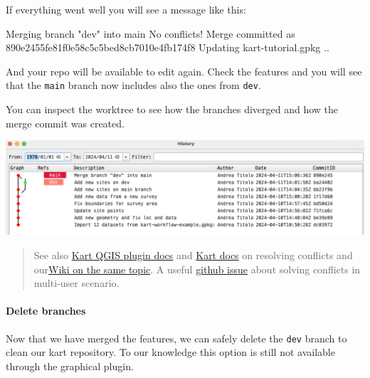\documentclass[
  letterpaper,
  DIV=11,
  numbers=noendperiod]{scrartcl}
\let\oldparagraph\paragraph
\renewcommand{\paragraph}[1]{\oldparagraph{#1}\mbox{}}
\newenvironment{Shaded}{\begin{snugshade}}{\end{snugshade}}
\newcommand{\ExtensionTok}[1]{\textcolor[rgb]{0.55,0.91,0.99}{#1}}
\newcommand{\NormalTok}[1]{\textcolor[rgb]{0.97,0.97,0.95}{#1}}
\newcommand{\StringTok}[1]{\textcolor[rgb]{0.95,0.98,0.55}{#1}}
\begin{document}
If everything went well you will see a message like this:

\begin{Shaded}
\begin{Highlighting}[]
\ExtensionTok{Merging}\NormalTok{ branch }\StringTok{"dev"}\NormalTok{ into main}
\ExtensionTok{No}\NormalTok{ conflicts!}
\ExtensionTok{Merge}\NormalTok{ committed as 890e2455fe81f0e58c5c5bed8cb7010e4fb174f8}
\ExtensionTok{Updating}\NormalTok{ kart{-}tutorial.gpkg ..}
\end{Highlighting}
\end{Shaded}

And your repo will be available to edit again. Check the features and
you will see that the \texttt{main} branch now includes also the ones
from \texttt{dev}.

You can inspect the worktree to see how the branches diverged and how
the merge commit was created.

\begin{center}
\includegraphics{img/kart-panel-merge-result.png}
\end{center}

\begin{quote}
See also
\href{https://github.com/koordinates/kart-qgis-plugin/blob/main/docs/index.md\#working-with-branches}{Kart
QGIS plugin docs} and
\href{https://docs.kartproject.org/en/latest/pages/command_reference.html\#resolving-conflicts}{Kart
docs} on resolving conflicts and
our\href{https://github.com/UnitoAssyrianGovernance/.github/wiki/GIS-Vector-Data\#dealing-with-conflicts}{Wiki
on the same topic}. A useful
\href{https://github.com/koordinates/kart/issues/814}{github issue}
about solving conflicts in multi-user scenario.
\end{quote}

\paragraph{Delete branches}\label{delete-branches}

Now that we have merged the features, we can safely delete the
\texttt{dev} branch to clean our kart repository. To our knowledge this
option is still not available through the graphical plugin.
\end{document}

